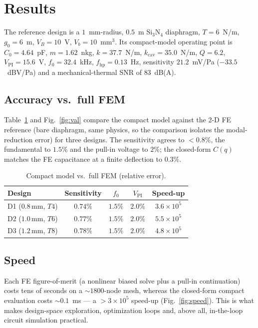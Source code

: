 \documentclass[conference]{IEEEtran}
\begin{document}
\section{Results}\label{sec:results}
The reference design is a $1$~mm-radius, $0.5$~\textmu m Si$_3$N$_4$ diaphragm,
$T=6$~N/m, $g_0=6$~\textmu m, $V_B=10$~V, $V_b=10$~mm$^3$. Its compact-model
operating point is $C_0=4.64$~pF, $m=1.62$~nkg, $k=37.7$~N/m,
$k_\mathrm{cav}=35.0$~N/m, $Q=6.2$, $V_\mathrm{PI}=15.6$~V, $f_0=32.4$~kHz,
$f_\mathrm{hp}=0.13$~Hz, sensitivity $21.2$~mV/Pa ($-33.5$~dBV/Pa) and a
mechanical-thermal SNR of $83$~dB(A).

\subsection{Accuracy vs.\ full FEM}
Table~\ref{tab:acc} and Fig.~\ref{fig:val} compare the compact model against the
2-D FE reference (bare diaphragm, same physics, so the comparison isolates the
modal-reduction error) for three designs. The sensitivity agrees to
$<\!0.8\%$, the fundamental to $1.5\%$ and the pull-in voltage to $2\%$; the
closed-form $C(q)$ matches the FE capacitance at a finite deflection to $0.3\%$.

\begin{table}[t]
\caption{Compact model vs.\ full FEM (relative error).}
\label{tab:acc}
\centering
\begin{tabular}{lcccc}
\toprule
Design & Sensitivity & $f_0$ & $V_\mathrm{PI}$ & Speed-up \\
\midrule
D1 ($0.8$\,mm, $T4$) & $0.74\%$ & $1.5\%$ & $2.0\%$ & $3.6\times10^{5}$ \\
D2 ($1.0$\,mm, $T6$) & $0.77\%$ & $1.5\%$ & $2.0\%$ & $5.5\times10^{5}$ \\
D3 ($1.2$\,mm, $T8$) & $0.78\%$ & $1.5\%$ & $2.0\%$ & $4.8\times10^{5}$ \\
\bottomrule
\end{tabular}
\end{table}

\subsection{Speed}
Each FE figure-of-merit (a nonlinear biased solve plus a pull-in continuation)
costs tens of seconds on a $\sim\!1800$-node mesh, whereas the closed-form
compact evaluation costs $\sim\!0.1$~ms --- a $>3\times10^{5}$ speed-up
(Fig.~\ref{fig:speed}). This is what makes design-space exploration,
optimization loops and, above all, in-the-loop circuit simulation practical.
\end{document}
